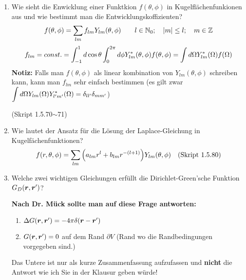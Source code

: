 \begin{enumerate}
  \item Wie sieht die Enwicklung einer Funktkion $f(\theta,\phi)$ in %
        Kugelflächenfunkionen aus und wie bestimmt man die 
        Entwicklungskoffizienten?
        $$\displaystyle f(\theta, \phi)=\sum_{lm} f_{lm}Y_{lm}(\theta,\phi)
        \qquad l\in \mathbb{N}_0;\quad \abs{m}\le l; 
        \quad m\in\mathbb{Z}$$
        $$\displaystyle f_{lm}=const.
         =\int_{-1}^{1} d\cos\theta\int_0^{2\pi}d\phi 
         Y^*_{lm}(\theta,\phi)f(\theta,\phi)
         =\int d\Omega Y^*_{lm}(\Omega)f(\Omega)$$
         \textbf{Notiz:} Falls man $f(\theta,\phi)$ als linear kombination
         von $Y_{lm}(\theta,\phi)$ schreiben kann, kann man $f_{lm}$
         sehr einfach bestimmen (es gilt zwar $\displaystyle \int d\Omega 
         Y_{lm}(\Omega)Y_{l'm'}^*(\Omega)=\delta_{ll'}\delta_{mm'}$)
        \begin{center}
          (Skript 1.5.70$\sim$71)
        \end{center}

  \item Wie lautet der Ansatz für die Lösung der Laplace-Gleichung in %
        Kugelfächenfunktionen?\\
        $$f(r,\theta,\phi)=
        \sum_{lm}\qty(a_{lm}r^l+b_{lm}r^{-(l+1)})Y_{lm}(\theta,\phi)
        \quad\text{(Skript 1.5.80)}$$
         
  \item Welche zwei wichtigen Gleichungen erfüllt die %
    Dirichlet-Green'sche
        Funktion $G_D(\vb* r, \vb* r')$?

        \textbf{Nach Dr. Mück sollte man auf diese Frage antworten:}
        \begin{enumerate}
          \item $\Delta G(\vb* r, \vb* r')=-4\pi \delta(\vb* r- \vb*r')$
          \item $G(\vb* r, \vb* r')=0$ auf dem Rand $\partial V$ (Rand 
            wo die Randbedingungen vorgegeben sind.)
        \end{enumerate}

        Das Untere ist nur als kurze Zusammenfassung aufzufassen und  
        \textbf{nicht} die Antwort wie ich Sie in der Klausur geben würde!


\end{enumerate}
